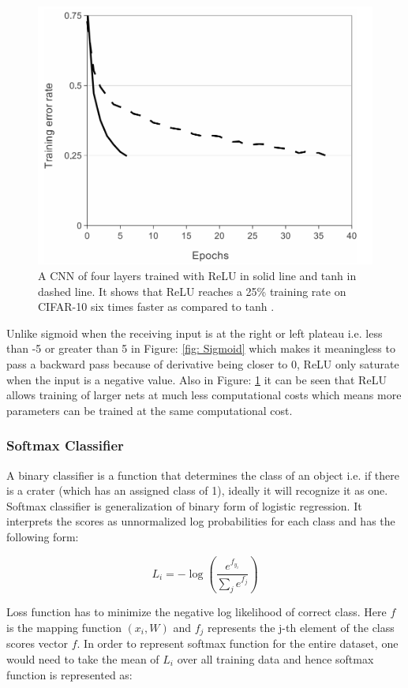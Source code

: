 \documentclass[11pt]{article}
\begin{document}
\begin{figure}[ht!]
	\centering
	\includegraphics[width=.6\linewidth]{files/cnn_architecture/relu_fast.png}
	\caption{A CNN of four layers trained with ReLU in solid line and tanh in dashed line. It shows that ReLU reaches a 25\% training rate on CIFAR-10 six times faster as compared to tanh \cite{krizhevsky2012imagenet}. }
	\label{fig: relu_fast}
\end{figure}

Unlike sigmoid when the receiving input is at the right or left plateau i.e. less than -5 or greater than 5 in Figure: \ref{fig: Sigmoid} which makes it meaningless to pass a backward pass because of derivative being closer to 0, ReLU only saturate when the input is a negative value. Also in Figure: \ref{fig: relu_fast} it can be seen that ReLU allows training of larger nets at much less computational costs which means more parameters can be trained at the same computational cost.

\subsubsection{Softmax Classifier}
A binary classifier is a function that determines the class of an object i.e. if there is a crater (which has an assigned class of 1), ideally it will recognize it as one. Softmax classifier is generalization of binary form of logistic regression. It interprets the scores as unnormalized log probabilities for each class and has the following form:

\begin{equation}
\label{singlesoftmax}
L_i = -\log\left(\frac{e^{f_{y_i}}}{ \sum_j e^{f_j} }\right) 
\end{equation}

Loss function has to minimize the negative log likelihood of correct class. Here $f$ is the mapping function $(x_i,W)$ and $f_j$ represents the j-th element of the class scores vector $f$. In order to represent softmax function for the entire dataset, one would need to take the mean of $L_i$ over all training data and hence softmax function is represented as:
\end{document}
